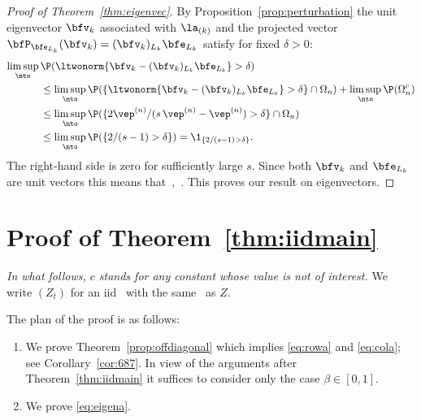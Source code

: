 \begin{proof}[Proof of Theorem~\ref{thm:eigenvec}]
By Proposition~\ref{prop:perturbation} the unit eigenvector $\bfv_k$ associated with $\la_{(k)}$ and the projected vector $\bfP_{\bfe_{L_k}}(\bfv_{k})=(\bfv_{k})_{L_k}\bfe_{L_k}$ satisfy for fixed $\delta>0$:
\begin{equation*}
\begin{split}
\limsup_{\nto} \, &\P(\ltwonorm{\bfv_k-(\bfv_{k})_{L_k}\bfe_{L_k}}>\delta)\\
&\le \limsup_{\nto} \P(\{\ltwonorm{\bfv_k-(\bfv_{k})_{L_k}\bfe_{L_k}}>\delta\} \cap \Omega_n)+ \limsup_{\nto}\P(\Omega_n^c)\\
&\le \limsup_{\nto} \P(\{2\vep^{(n)}/(s\,\vep^{(n)}-\vep^{(n)})>\delta\} \cap \Omega_n)\\
&\le \limsup_{\nto} \P(\{2/(s-1)>\delta\})=  \1_{\{ 2/(s-1)>\delta\}}.
\end{split}
\end{equation*}
The right-hand side is zero for sufficiently large $s$. Since both $\bfv_k$ and $\bfe_{L_k}$ are unit vectors this means that
\beao
{} \,, \quad \nto \,.
\eeao
This proves our result on eigenvectors.
\end{proof}




\section{Proof of Theorem~\ref{thm:iidmain} }\label{sec:proofs}
{\em In what follows, $c$ stands for any constant whose value is not of interest.}
We write $(Z_t)$ for an iid \seq\ with the same \ds\ as $Z$.
\par
The plan of the proof is as follows:
\begin{enumerate}
\item
We prove  Theorem~\ref{prop:offdiagonal} which implies \eqref{eq:rowa} and \eqref{eq:cola}; see Corollary~\ref{cor:687}.
In view of the arguments after Theorem~\ref{thm:iidmain} it suffices to consider only the case $\beta\in [0,1]$.
\item
We prove \eqref{eq:eigena}.
\end{enumerate} 
